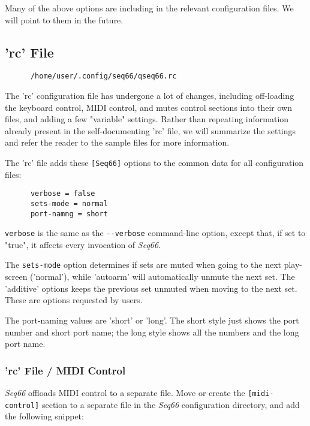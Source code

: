       Many of the above options are including in the relevant configuration
      files.  We will point to them in the future.

\subsection{'rc' File}
\label{subsec:configuration_rc}

   \begin{verbatim}
      /home/user/.config/seq66/qseq66.rc
   \end{verbatim}

   The 'rc' configuration file has undergone a lot of changes, including
   off-loading the keyboard control, MIDI control, and mutes control sections
   into their own files, and adding a few "variable" settings.
   Rather than repeating information already present in the self-documenting
   'rc' file, we will summarize the settings and refer the reader to the sample
   files for more information.

   The 'rc' file adds these \texttt{[Seq66]} options to the common
   data for all configuration files:

   \begin{verbatim}
      verbose = false
      sets-mode = normal
      port-namng = short
   \end{verbatim}

   \texttt{verbose} is the same as the \texttt{-{}-verbose} command-line option,
   except that, if set to "true", it affects every invocation of \textsl{Seq66}.

   The \texttt{sets-mode} option determines if sets are muted when going to the
   next play-screen ('normal'), while 'autoarm' will automatically
   unmute the next set.  The 'additive' options keeps the previous
   set unmuted when moving to the next set.  These are options requested by
   users.

  The port-naming values are 'short' or 'long'.  The short style
  just shows the port number and short port name; the long style
  shows all the numbers and the long port name.

\subsubsection{'rc' File / MIDI Control}
\label{subsubsec:configuration_rc_midi_control}

   \textsl{Seq66} offloads MIDI control to a separate file.
   Move or create
   the \texttt{[midi-control]} section to a separate file in
   the \textsl{Seq66} configuration directory, and add the following
   snippet:

